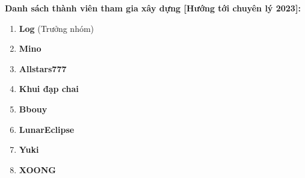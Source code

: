 { \normalcolor \textbf{Danh sách thành viên tham gia xây dựng [Hướng tới chuyên lý 2023]:}} \\ \vspace{0.5cm}

\begin{enumerate}
    \item \textbf{Log} (Trưởng nhóm)
    \item \textbf{Mino}
    \item \textbf{Allstars777}
    \item \textbf{Khui đạp chai}
    \item \textbf{Bbouy}
    \item \textbf{LunarEclipse}
    \item \textbf{Yuki}
    \item \textbf{XOONG}
\end{enumerate}

